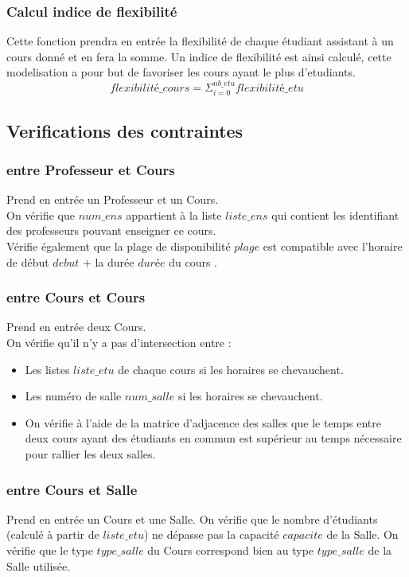 \documentclass[a4paper,11pt]{article}
\begin{document}
		\subsubsection{Calcul indice de flexibilité}
		Cette fonction prendra en entrée la flexibilité de chaque étudiant assistant à un cours donné et en fera la somme. 
		Un indice de flexibilité est ainsi calculé, cette modelisation a pour but de favoriser les cours ayant le plus d'etudiants.\\
		$$flexibilité\_cours = \Sigma_{i = 0}^{nb\_etu} flexibilité\_etu$$
	\subsection{Verifications des contraintes}
		\subsubsection{entre Professeur et Cours}
			Prend en entrée un Professeur et un Cours.\\
			On vérifie que $num\_ens$ appartient à la liste $liste\_ens$ qui contient les identifiant des professeurs pouvant enseigner ce cours.\\
			Vérifie également que la plage de disponibilité $plage$ est compatible avec l'horaire de début $debut$ + la durée $durée$ du cours .
		\subsubsection{entre Cours et Cours}
			Prend en entrée deux Cours.\\
			On vérifie qu'il n'y a pas d'intersection entre :\\
			\begin{itemize}
				\item Les listes $liste\_etu$ de chaque cours si les horaires se chevauchent.
				\item Les numéro de salle $num\_salle$ si les horaires se chevauchent.
				\item On vérifie à l'aide de la matrice d'adjacence des salles que le temps entre deux cours ayant des étudiants en commun est supérieur au temps nécessaire pour rallier les deux salles.
			\end{itemize}
		\subsubsection{entre Cours et Salle}
			Prend en entrée un Cours et une Salle.
			On vérifie que le nombre d'étudiants (calculé à partir de $liste\_etu$) ne dépasse pas la capacité $capacite$ de la Salle.
			On vérifie que le type $type\_salle$ du Cours correspond bien au type $type\_salle$ de la Salle utilisée.
\end{document}
